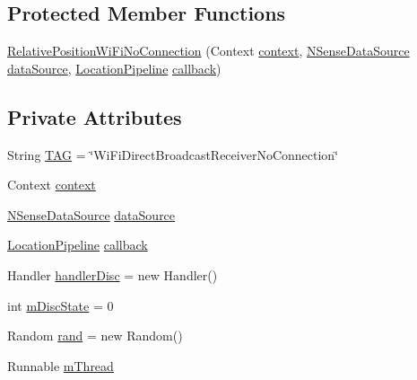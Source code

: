 \subsection*{Protected Member Functions}
\begin{DoxyCompactItemize}
\item 
\hyperlink{classcs_1_1nsense_1_1location_1_1_relative_position_wi_fi_no_connection_abcc39a93b80d6142449a201b0af1740a}{Relative\-Position\-Wi\-Fi\-No\-Connection} (Context \hyperlink{classcs_1_1nsense_1_1location_1_1_relative_position_wi_fi_no_connection_a68782459a5e4aad49133ccd2551c113e}{context}, \hyperlink{classcs_1_1nsense_1_1db_1_1_n_sense_data_source}{N\-Sense\-Data\-Source} \hyperlink{classcs_1_1nsense_1_1location_1_1_relative_position_wi_fi_no_connection_af30a84fb5c0da89fe5f7f0abb96833f3}{data\-Source}, \hyperlink{classcs_1_1nsense_1_1location_1_1_location_pipeline}{Location\-Pipeline} \hyperlink{classcs_1_1nsense_1_1location_1_1_relative_position_wi_fi_no_connection_a98cb1937c6831daadf0f756f8e73f86d}{callback})
\end{DoxyCompactItemize}
\subsection*{Private Attributes}
\begin{DoxyCompactItemize}
\item 
String \hyperlink{classcs_1_1nsense_1_1location_1_1_relative_position_wi_fi_no_connection_a82d5b0f8acf6eb34df38822886fa6837}{T\-A\-G} = \char`\"{}Wi\-Fi\-Direct\-Broadcast\-Receiver\-No\-Connection\char`\"{}
\item 
Context \hyperlink{classcs_1_1nsense_1_1location_1_1_relative_position_wi_fi_no_connection_a68782459a5e4aad49133ccd2551c113e}{context}
\item 
\hyperlink{classcs_1_1nsense_1_1db_1_1_n_sense_data_source}{N\-Sense\-Data\-Source} \hyperlink{classcs_1_1nsense_1_1location_1_1_relative_position_wi_fi_no_connection_af30a84fb5c0da89fe5f7f0abb96833f3}{data\-Source}
\item 
\hyperlink{classcs_1_1nsense_1_1location_1_1_location_pipeline}{Location\-Pipeline} \hyperlink{classcs_1_1nsense_1_1location_1_1_relative_position_wi_fi_no_connection_a98cb1937c6831daadf0f756f8e73f86d}{callback}
\item 
Handler \hyperlink{classcs_1_1nsense_1_1location_1_1_relative_position_wi_fi_no_connection_ab35de61c8129bae5c2a6e8e85b8cf973}{handler\-Disc} = new Handler()
\item 
int \hyperlink{classcs_1_1nsense_1_1location_1_1_relative_position_wi_fi_no_connection_a2e8e9aeb6f103368e34eba7f281994a2}{m\-Disc\-State} = 0
\item 
Random \hyperlink{classcs_1_1nsense_1_1location_1_1_relative_position_wi_fi_no_connection_a4849efb8ccfe42411bb5a4f8232c6299}{rand} = new Random()
\item 
Runnable \hyperlink{classcs_1_1nsense_1_1location_1_1_relative_position_wi_fi_no_connection_af42d1fdeb0b3338991ffad86388898ad}{m\-Thread}
\end{DoxyCompactItemize}


